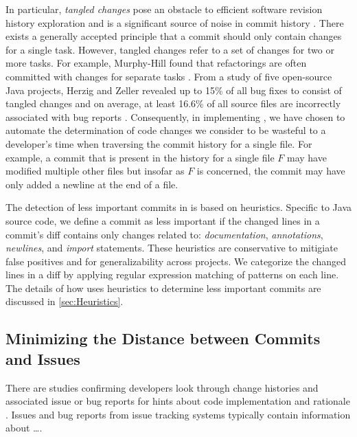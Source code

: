 In particular, \emph{tangled changes} pose an obstacle to efficient software revision history exploration and is a significant source of noise in commit history \cite{herzig_tangled_2013}.
There exists a generally accepted principle that a commit should only contain changes for a single task.
However, tangled changes refer to a set of changes for two or more tasks. 
For example, Murphy-Hill \etal found that refactorings are often committed with changes for separate tasks \cite{murphy-hill_refactor_2012}. 
From a study of five open-source Java projects, Herzig and Zeller revealed up to 15\% of all bug fixes to consist of tangled changes and on average, at least 16.6\% of all source files are incorrectly associated with bug reports \cite{herzig_tangled_2013}. Consequently, in implementing , we have chosen to automate the determination of code changes we consider to be wasteful to a developer's time when traversing the commit history for a single file. For example, a commit that is present in the history for a single file $F$ may have modified multiple other files but insofar as $F$ is concerned, the commit may have only added a newline at the end of a file.

The detection of less important commits in  is based on heuristics.
Specific to Java source code, we define a commit as less important if the changed lines in a commit's diff contains only changes related to: \emph{documentation}, \emph{annotations}, \emph{newlines}, and \emph{import} statements.
These heuristics are conservative to mitigiate false positives and for generalizability across projects.
We categorize the changed lines in a diff by applying regular expression matching of patterns on each line.
The details of how  uses heuristics to determine less important commits are discussed in \autoref{sec:Heuristics}.

\subsection{Minimizing the Distance between Commits and Issues}
\label{subsec:Minimize-Commit-Issue-Distance}

There are studies confirming developers look through change histories and associated issue or bug reports for hints about code implementation and rationale \cite{ko_information_2007,robillard_turnover-induced_2021, rastkar_why_2013}.
Issues and bug reports from issue tracking systems typically contain information about \dots.

